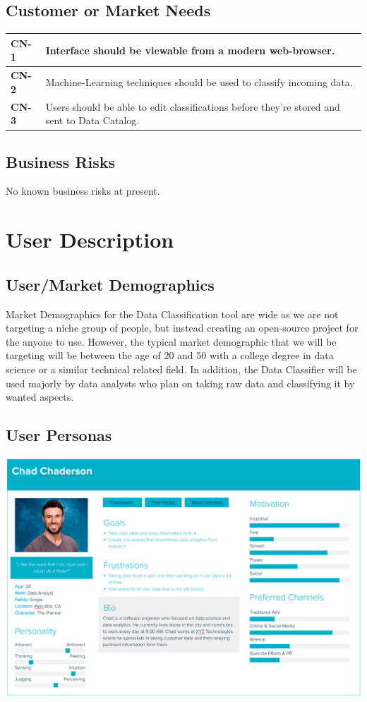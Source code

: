 \documentclass[12pt,oneside,letterpaper]{article}
\begin{document}
\subsection{Customer or Market Needs}
\begin{tabular}{|p{1in}p{4.5in}|}
\hline
\textbf{CN-1}&Interface should be viewable from a modern web-browser.\\
\hline
\textbf{CN-2}&Machine-Learning techniques should be used to classify incoming data.\\
\hline
\textbf{CN-3}&Users should be able to edit classifications before they're stored and sent to Data Catalog.\\
\hline
\end{tabular}
\subsection{Business Risks}
No known business risks at present.

\section{User Description}
\subsection{User/Market Demographics}
Market Demographics for the Data Classification tool are wide as we are not targeting a niche group of people, but instead creating an open-source project for the anyone to use. However, the typical market demographic that we will be targeting will be between the age of 20 and 50 with a college degree in data science or a similar technical related field. In addition, the Data Classifier will be used majorly by data analysts who plan on taking raw data and classifying it by wanted aspects. 

\subsection{User Personas}
\includegraphics[scale = .35, angle = 270]{Chad.png}
\end{document}
